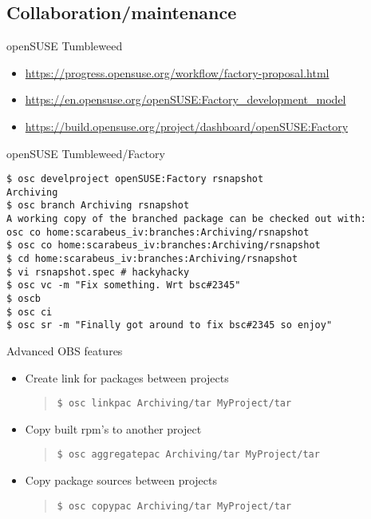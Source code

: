 \documentclass{beamer}
\begin{document}
\subsection{Collaboration/maintenance}

\begin{frame}{openSUSE Tumbleweed}
	\begin{itemize}
	\item{\url{https://progress.opensuse.org/workflow/factory-proposal.html}}
	\item{\url{https://en.opensuse.org/openSUSE:Factory\_development\_model}}
	\item{\url{https://build.opensuse.org/project/dashboard/openSUSE:Factory}}
	\end{itemize}
\end{frame}

\begin{frame}[fragile]{openSUSE Tumbleweed/Factory}
	\begin{small}
\begin{verbatim}
$ osc develproject openSUSE:Factory rsnapshot
Archiving
$ osc branch Archiving rsnapshot
A working copy of the branched package can be checked out with:
osc co home:scarabeus_iv:branches:Archiving/rsnapshot
$ osc co home:scarabeus_iv:branches:Archiving/rsnapshot
$ cd home:scarabeus_iv:branches:Archiving/rsnapshot
$ vi rsnapshot.spec # hackyhacky
$ osc vc -m "Fix something. Wrt bsc#2345"
$ oscb
$ osc ci
$ osc sr -m "Finally got around to fix bsc#2345 so enjoy"
\end{verbatim}
	\end{small}
\end{frame}


\begin{frame}[fragile]{Advanced OBS features}
  \begin{itemize}
    \item Create link for packages between projects 
      \begin{quote}
\begin{verbatim}$ osc linkpac Archiving/tar MyProject/tar\end{verbatim}
      \end{quote}
    \item Copy built rpm's to another project
      \begin{quote}
\begin{verbatim}$ osc aggregatepac Archiving/tar MyProject/tar\end{verbatim}
      \end{quote}
    \item Copy package sources between projects
      \begin{quote}
\begin{verbatim}$ osc copypac Archiving/tar MyProject/tar\end{verbatim}
      \end{quote}
  \end{itemize}
\end{frame}
\end{document}
